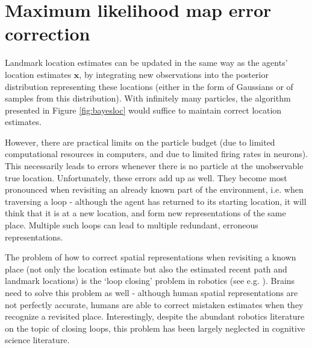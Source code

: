 
\clearpage

\section{Maximum likelihood map error correction}
\label{sec:bayescorr}

Landmark location estimates can be updated in the same way as the agents' location estimates $\bm x$, by integrating new observations into the posterior distribution representing these locations (either in the form of Gaussians or of samples from this distribution). With infinitely many particles, the algorithm presented in Figure \ref{fig:bayesloc} would suffice to maintain correct location estimates. 

However, there are practical limits on the particle budget (due to limited computational resources in computers, and due to limited firing rates in neurons). This necessarily leads to errors whenever there is no particle at the unobservable true location. Unfortunately, these errors add up as well. They become most pronounced when revisiting an already known part of the environment, i.e. when traversing a loop - although the agent has returned to its starting location, it will think that it is at a new location, and form new representations of the same place. Multiple such loops can lead to multiple redundant, erroneous representations. 

The problem of how to correct spatial representations when revisiting a known place (not only the location estimate but also the estimated recent path and landmark locations) is the `loop closing' problem in robotics (see e.g. \citep{williams2009comparison, thrun2008simultaneous}). Brains need to solve this problem as well - although human spatial representations are not perfectly accurate, humans are able to correct mistaken estimates when they recognize a revisited place. Interestingly, despite the abundant robotics literature on the topic of closing loops, this problem has been largely neglected in cognitive science literature. 


